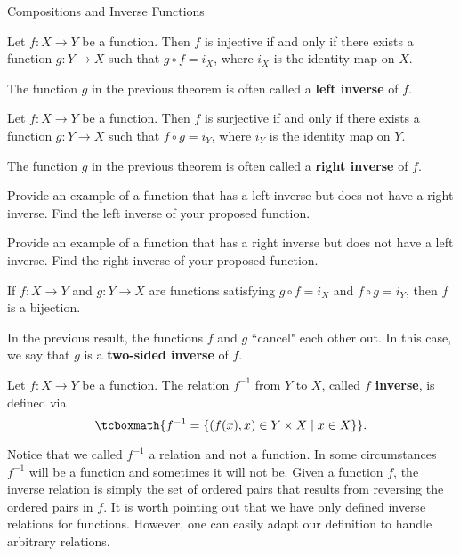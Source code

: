\begin{section}{Compositions and Inverse Functions}
\begin{theorem}
Let $f:X\to Y$ be a function. Then $f$ is injective if and only if there exists a function $g:Y\to X$ such that $g\circ f=i_X$, where $i_X$ is the identity map on $X$.
\end{theorem}

The function $g$ in the previous theorem is often called a \textbf{left inverse} of $f$.

\begin{theorem}
Let $f:X\to Y$ be a function. Then $f$ is surjective if and only if there exists a function $g:Y\to X$ such that $f\circ g=i_Y$, where $i_Y$ is the identity map on $Y$.
\end{theorem}

The function $g$ in the previous theorem is often called a \textbf{right inverse} of $f$.

\begin{problem}
Provide an example of a function that has a left inverse but does not have a right inverse. Find the left inverse of your proposed function.
\end{problem}

\begin{problem}
Provide an example of a function that has a right inverse but does not have a left inverse. Find the right inverse of your proposed function.
\end{problem}

\begin{corollary}\label{cor:two-sided inverse}
If $f:X\to Y$ and $g:Y\to X$ are functions satisfying $g\circ f=i_X$ and  $f\circ g=i_Y$, then $f$ is a bijection.
\end{corollary}

In the previous result, the functions $f$ and $g$ ``cancel" each other out. In this case, we say that $g$ is a \textbf{two-sided inverse} of $f$.

\begin{definition}\label{def:inverse of a function}
Let $f:X\to Y$ be a function.  The relation $f^{-1}$ from $Y$ to $X$, called \textbf{$f$ inverse}, is defined via
\[
\tcboxmath{f^{-1}=\{(f(x),x)\in Y\times X\mid x\in X\}}.
\] 
\end{definition}

Notice that we called $f^{-1}$ a relation and not a function.  In some circumstances $f^{-1}$ will be a function and sometimes it will not be. Given a function $f$, the inverse relation is simply the set of ordered pairs that results from reversing the ordered pairs in $f$.  It is worth pointing out that we have only defined inverse relations for functions.  However, one can easily adapt our definition to handle arbitrary relations.


\end{section}
